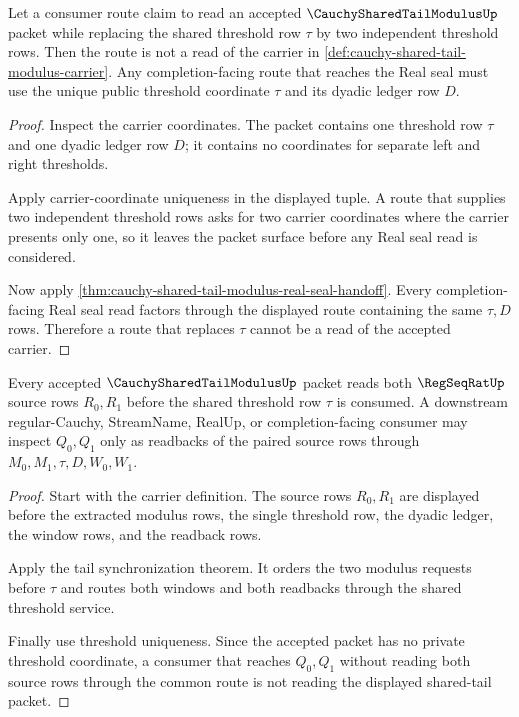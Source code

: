\begin{theorem}
\label{thm:cauchy-shared-tail-modulus-threshold-uniqueness-obligation}
Let a consumer route claim to read an accepted $\CauchySharedTailModulusUp$ packet while replacing the shared threshold row $\tau$ by two independent threshold rows. Then the route is not a read of the carrier in \autoref{def:cauchy-shared-tail-modulus-carrier}. Any completion-facing route that reaches the Real seal must use the unique public threshold coordinate $\tau$ and its dyadic ledger row $D$.
\end{theorem}
\begin{proof}
Inspect the carrier coordinates. The packet contains one threshold row $\tau$ and one dyadic ledger row $D$; it contains no coordinates for separate left and right thresholds.

Apply carrier-coordinate uniqueness in the displayed tuple. A route that supplies two independent threshold rows asks for two carrier coordinates where the carrier presents only one, so it leaves the packet surface before any Real seal read is considered.

Now apply \autoref{thm:cauchy-shared-tail-modulus-real-seal-handoff}. Every completion-facing Real seal read factors through the displayed route containing the same $\tau,D$ rows. Therefore a route that replaces $\tau$ cannot be a read of the accepted carrier.
\end{proof}

\begin{theorem}
\label{thm:cauchy-shared-tail-modulus-paired-source-readback}
Every accepted $\CauchySharedTailModulusUp$ packet reads both $\RegSeqRatUp$ source rows $R_0,R_1$ before the shared threshold row $\tau$ is consumed. A downstream regular-Cauchy, StreamName, RealUp, or completion-facing consumer may inspect $Q_0,Q_1$ only as readbacks of the paired source rows through $M_0,M_1,\tau,D,W_0,W_1$.
\end{theorem}
\begin{proof}
Start with the carrier definition. The source rows $R_0,R_1$ are displayed before the extracted modulus rows, the single threshold row, the dyadic ledger, the window rows, and the readback rows.

Apply the tail synchronization theorem. It orders the two modulus requests before $\tau$ and routes both windows and both readbacks through the shared threshold service.

Finally use threshold uniqueness. Since the accepted packet has no private threshold coordinate, a consumer that reaches $Q_0,Q_1$ without reading both source rows through the common route is not reading the displayed shared-tail packet.
\end{proof}

